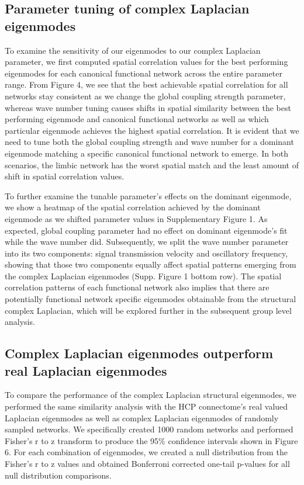\documentclass{article}
\begin{document}
\subsection{Parameter tuning of complex Laplacian eigenmodes}
To examine the sensitivity of our eigenmodes to our complex Laplacian parameter, we first computed spatial correlation values for the best performing eigenmodes for each canonical functional network across the entire parameter range. From Figure 4, we see that the best achievable spatial correlation for all networks stay consistent as we change the global coupling strength parameter, whereas wave number tuning causes shifts in spatial similarity between the best performing eigenmode and canonical functional networks as well as which particular eigenmode achieves the highest spatial correlation. It is evident that we need to tune both the global coupling strength and wave number for a dominant eigenmode matching a specific canonical functional network to emerge. In both scenarios, the limbic network has the worst spatial match and the least amount of shift in spatial correlation values. 

To further examine the tunable parameter's effects on the dominant eigenmode, we show a heatmap of the spatial correlation achieved by the dominant eigenmode as we shifted parameter values in Supplementary Figure 1. As expected, global coupling parameter had no effect on dominant eigenmode's fit while the wave number did. Subsequently, we split the wave number parameter into its two components: signal transmission velocity and oscillatory frequency, showing that those two components equally affect spatial patterns emerging from the complex Laplacian eigenmodes (Supp. Figure 1 bottom row). The spatial correlation patterns of each functional network also implies that there are potentially functional network specific eigenmodes obtainable from the structural complex Laplacian, which will be explored further in the subsequent group level analysis.

\subsection{Complex Laplacian eigenmodes outperform real Laplacian eigenmodes}
To compare the performance of the complex Laplacian structural eigenmodes, we performed the same similarity analysis with the HCP connectome's real valued Laplacian eigenmodes as well as complex Laplacian eigenmodes of randomly sampled networks. We specifically created 1000 random networks and performed Fisher's r to z transform to produce the 95\% confidence intervals shown in Figure 6. For each combination of eigenmodes, we created a null distribution from the Fisher's r to z values and obtained Bonferroni corrected one-tail p-values for all null distribution comparisons. 
\end{document}
